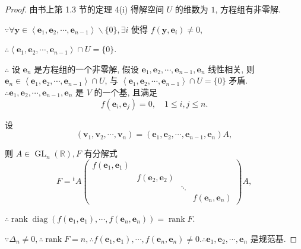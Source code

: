 \documentclass{ctexart}
\begin{document}
\begin{proof}
    由书上第 1.3 节的定理 4(i) 得解空间 $U$ 的维数为 $1$, 方程组有非零解.

    $\because\forall\boldsymbol{y}\in\left<\boldsymbol{e}_1,\boldsymbol{e}_2,\cdots,\boldsymbol{e}_{n-1}\right>\backslash\{0\},\exists i$ 使得 $f(\boldsymbol{y},\boldsymbol{e}_i)\neq0$,
    
    $\therefore\left<\boldsymbol{e}_1,\boldsymbol{e}_2,\cdots,\boldsymbol{e}_{n-1}\right>\cap U=\{0\}$.

    $\therefore$ 设 $\boldsymbol{e}_n$ 是方程组的一个非零解, 假设 $\boldsymbol{e}_1,\boldsymbol{e}_2,\cdots,\boldsymbol{e}_{n-1},\boldsymbol{e}_n$ 线性相关, 则 $\boldsymbol{e}_n\in\left<\boldsymbol{e}_1,\boldsymbol{e}_2,\cdots,\boldsymbol{e}_{n-1}\right>\cap U$, 与 $\left<\boldsymbol{e}_1,\boldsymbol{e}_2,\cdots,\boldsymbol{e}_{n-1}\right>\cap U=\{0\}$ 矛盾. $\therefore\boldsymbol{e}_1,\boldsymbol{e}_2,\cdots,\boldsymbol{e}_{n-1},\boldsymbol{e}_n$ 是 $V$ 的一个基, 且满足
    \[f(\boldsymbol{e}_i,\boldsymbol{e}_j)=0,\quad1\leq i,j\leq n.\]
    
    设
    \[(\boldsymbol{v}_1,\boldsymbol{v}_2,\cdots,\boldsymbol{v}_n)=(\boldsymbol{e}_1,\boldsymbol{e}_2,\cdots,\boldsymbol{e}_{n-1},\boldsymbol{e}_n)A,\]

    则 $A\in\operatorname{GL}_n(\mathbb{R}),F$ 有分解式
    \begin{equation}\label{eq3.3}
        F={}^tA\begin{pmatrix}
            f(\boldsymbol{e}_1,\boldsymbol{e}_1) \\
            & f(\boldsymbol{e}_2,\boldsymbol{e}_2) \\
            && \ddots \\
            &&& f(\boldsymbol{e}_n,\boldsymbol{e}_n)
        \end{pmatrix}A,
    \end{equation}

    $\therefore\operatorname{rank}\operatorname{diag}(f(\boldsymbol{e}_1,\boldsymbol{e}_1),\cdots,f(\boldsymbol{e}_n,\boldsymbol{e}_n))=\operatorname{rank}F$.

    $\because\Delta_n\neq0,\therefore\operatorname{rank}F=n,\therefore f(\boldsymbol{e}_1,\boldsymbol{e}_1),\cdots,f(\boldsymbol{e}_n,\boldsymbol{e}_n)\neq0.\therefore\boldsymbol{e}_1,\boldsymbol{e}_2,\cdots,\boldsymbol{e}_n$ 是规范基.


\end{proof}
\end{document}
